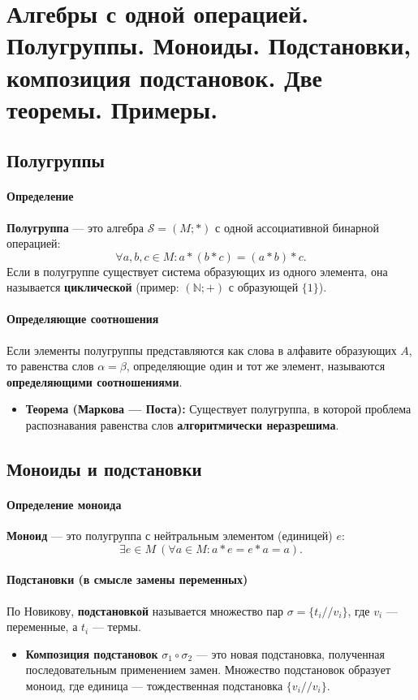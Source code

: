 \section{Алгебры с одной операцией. Полугруппы. Моноиды. Подстановки, композиция подстановок. Две теоремы. Примеры.}

\subsection*{Полугруппы}

\paragraph{Определение}
\textbf{Полугруппа} — это алгебра $\mathcal{S} = (M; \ast)$ с одной ассоциативной бинарной операцией:
$$\forall a, b, c \in M: a \ast (b \ast c) = (a \ast b) \ast c.$$
Если в полугруппе существует система образующих из одного элемента, она называется \textbf{циклической} (пример: $(\mathbb{N}; +)$ с образующей $\{1\}$).

\paragraph{Определяющие соотношения}
Если элементы полугруппы представляются как слова в алфавите образующих $A$, то равенства слов $\alpha = \beta$, определяющие один и тот же элемент, называются \textbf{определяющими соотношениями}.
\begin{itemize}
    \item \textbf{Теорема (Маркова — Поста):} Существует полугруппа, в которой проблема распознавания равенства слов \textbf{алгоритмически неразрешима}.
\end{itemize}

\subsection*{Моноиды и подстановки}

\paragraph{Определение моноида}
\textbf{Моноид} — это полугруппа с нейтральным элементом (единицей) $e$:
$$\exists e \in M \ (\forall a \in M: a \ast e = e \ast a = a).$$

\paragraph{Подстановки (в смысле замены переменных)}
По Новикову, \textbf{подстановкой} называется множество пар $\sigma = \{t_i // v_i\}$, где $v_i$ — переменные, а $t_i$ — термы.
\begin{itemize}
    \item \textbf{Композиция подстановок} $\sigma_1 \circ \sigma_2$ — это новая подстановка, полученная последовательным применением замен. Множество подстановок образует моноид, где единица — тождественная подстановка $\{v_i // v_i\}$.
\end{itemize}

